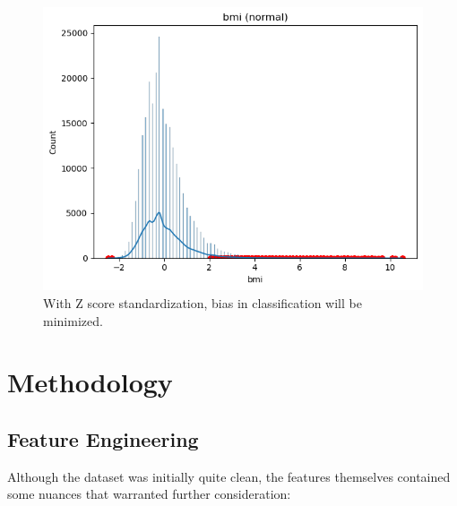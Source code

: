 \documentclass[conference]{IEEEtran}
\begin{document}
    \begin{figure}[h]
        \centering
        \includegraphics[scale=0.39]
        {bmi_standardized}
        \caption{With Z score standardization, bias in classification will be minimized.}

        \label{fig:bmi standardized}
    \end{figure}





\section{Methodology}\label{sec:methodology}
    \subsection{Feature Engineering}
    Although the dataset was initially quite clean, the features themselves contained some nuances that warranted further consideration:
\end{document}

